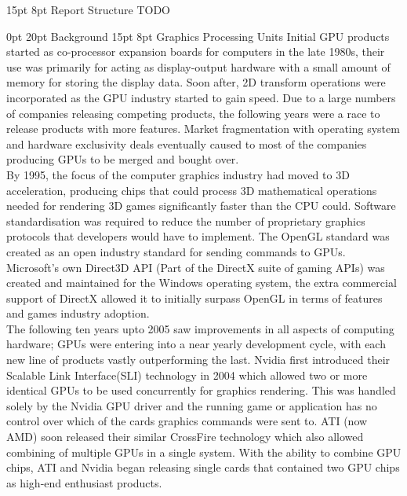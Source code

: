 \documentclass[12pt,a4paper]{article}
\makeatletter
\renewcommand\subsection{\@startsection {subsection}{1}{2mm} %
                               {15pt} %
                               {8pt} %
                               {\fontsize{13pt}{1em}\bfseries}}
\renewcommand\section{\@startsection {section}{1}{0mm} %
                               {0pt} %
                               {20pt} %
                               {\fontsize{14pt}{1em}\bfseries\newpage}}
\makeatother
\begin{document}
\subsection{Report Structure}
	TODO
		
\section{Background}
\subsection{Graphics Processing Units}
Initial GPU products started as co-processor expansion boards for computers in the late 1980s, their use was primarily for acting as display-output hardware with a small amount of memory for storing the display data. Soon after, 2D transform operations were incorporated as the GPU industry started to gain speed. Due to a large numbers of companies releasing competing products, the following years were a race to release products with more features. Market fragmentation with operating system and hardware exclusivity deals eventually caused to most of the companies producing GPUs to be merged and bought over.
\\
By 1995, the focus of the computer graphics industry had moved to 3D acceleration, producing chips that could process 3D mathematical operations needed for rendering 3D games significantly faster than the CPU could. Software standardisation was required to reduce the number of proprietary graphics protocols that developers would have to implement. The OpenGL standard was created as an open industry standard for sending commands to GPUs. Microsoft's own Direct3D API (Part of the DirectX suite of gaming APIs) was created and maintained for the Windows operating system, the extra commercial support of DirectX allowed it to initially surpass OpenGL in terms of features and games industry adoption. 
\\
The following ten years upto 2005 saw improvements in all aspects of computing hardware; GPUs were entering into a near yearly development cycle, with each new line of products vastly outperforming the last. Nvidia first introduced their Scalable Link Interface(SLI) technology in 2004 which allowed two or more identical GPUs to be used concurrently for graphics rendering. This was handled solely by the Nvidia GPU driver and the running game or application has no control over which of the cards graphics commands were sent to. ATI (now AMD) soon released their similar CrossFire technology which also allowed combining of multiple GPUs in a single system. With the ability to combine GPU chips, ATI and Nvidia began releasing single cards that contained two GPU chips as high-end enthusiast products.
\end{document}
